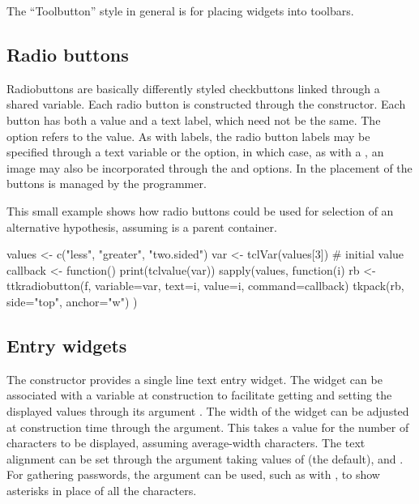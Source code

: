 The ``Toolbutton'' style in general is for placing widgets into toolbars.

\subsection{Radio buttons}
\label{sec:tcltk:radio-buttons}

Radiobuttons are basically differently styled checkbuttons linked through a shared \TCL\/
variable. Each radio button is constructed through the
 constructor. Each button has both a value and
a text label, which need not be the same. The
 option refers to the
value. As with labels, the radio button labels may be specified
through a text variable or the  option,
in which case, as with a , an image may also be
incorporated through the  and
 options. In \TK\/ the placement of
the buttons is managed by the programmer.


This small example shows how radio buttons could be used for selection
of an alternative hypothesis, assuming  is a parent container.

\begin{Schunk}
\begin{Sinput}
 values <- c("less", "greater", "two.sided")
 var <- tclVar(values[3])                # initial value
 callback <- function() print(tclvalue(var))
 sapply(values, function(i) {
   rb <- ttkradiobutton(f, variable=var, 
                        text=i, value=i, 
                        command=callback)
   tkpack(rb, side="top", anchor="w")
 })
\end{Sinput}
\end{Schunk}

\subsection{Entry widgets}
\label{sec:tcltk:entry-widgets}

The  constructor provides a single line text
entry widget. The widget can be associated with a \TCL\/ variable at
construction to facilitate getting and setting the displayed values
through its argument . The width of
the widget can be adjusted at construction time through the
 argument. This takes a value for the number
of characters to be displayed, assuming average-width characters.  The
text alignment can be set through the 
argument taking values of  (the default), 
and . For gathering passwords, the argument
 can be used, such as with
\qcode{*}, to show asterisks in place of all the
characters.

